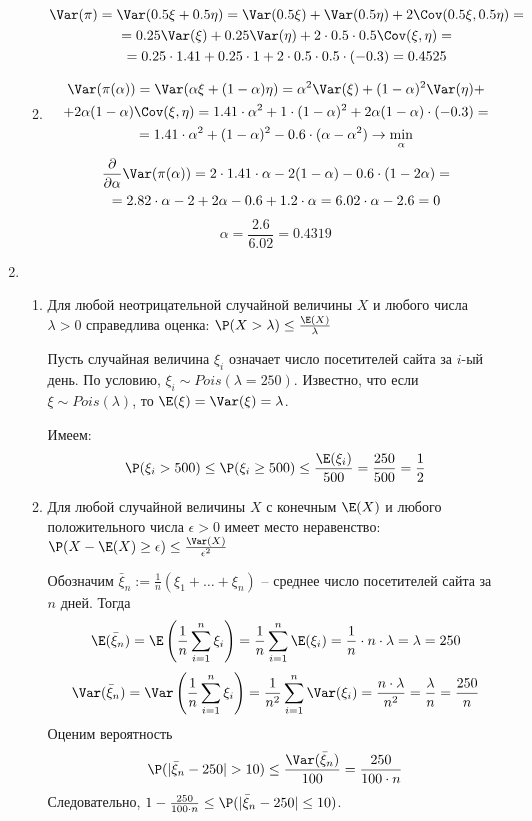 \begin{enumerate}
\begin{enumerate}
\begin{multline*}
\Var(\pi) = \Var(0.5 \xi + 0.5 \eta) = \Var(0.5 \xi) + \Var(0.5\eta) + 2 \Cov (0.5\xi, 0.5\eta) = \\
= 0.25\Var(\xi) + 0.25\Var(\eta) + 2 \cdot 0.5 \cdot 0.5 \Cov(\xi, \eta) = \\
= 0.25 \cdot 1.41 + 0.25 \cdot 1 + 2 \cdot 0.5 \cdot 0.5 \cdot (-0.3) = 0.4525
\end{multline*}
\item
\begin{multline*}
\Var(\pi(\alpha)) = \Var(\alpha \xi + (1-\alpha)\eta) = \alpha^2\Var(\xi) + (1-\alpha)^2 \Var(\eta) + \\
+ 2\alpha(1-\alpha) \Cov(\xi, \eta) = 1.41 \cdot \alpha^2 + 1\cdot (1-\alpha)^2 + 2\alpha(1-\alpha) \cdot (-0.3) = \\
= 1.41 \cdot \alpha^2 + (1-\alpha)^2 - 0.6 \cdot (\alpha - \alpha^2) \to \min_\alpha
\end{multline*}
\begin{multline*}
\frac{\partial}{\partial \alpha} \Var(\pi(\alpha)) = 2 \cdot 1.41 \cdot \alpha -2(1-\alpha) -0.6\cdot(1-2\alpha) = \\
= 2.82 \cdot \alpha - 2 + 2\alpha - 0.6 + 1.2 \cdot \alpha = 6.02 \cdot \alpha - 2.6 = 0
\end{multline*}
\[
\alpha = \frac{2.6}{6.02} = 0.4319
\]
\end{enumerate}
\item \begin{enumerate}
\item Для любой неотрицательной случайной величины $X$ и любого числа $\lambda > 0$ справедлива оценка: $\P(X>\lambda) \leq \frac{\E(X)}{\lambda}$

Пусть случайная величина $\xi_i$ означает число посетителей сайта за $i$-ый день. По условию, $\xi_i \sim Pois(\lambda=250)$. Известно, что если $\xi \sim Pois(\lambda)$, то $\E(\xi) = \Var(\xi) = \lambda$.

Имеем:
\[
\P(\xi_i >500) \leq \P(\xi_i \geq 500) \leq \frac{\E(\xi_i)}{500} = \frac{250}{500} = \frac{1}{2}
\]
\item Для любой случайной величины $X$ с конечным $\E(X)$ и любого положительного числа $\epsilon > 0$ имеет место неравенство: $\P(X-\E(X)\geq\epsilon)\leq\frac{\Var(X)}{\epsilon^2}$

Обозначим $\bar{\xi}_n := \frac{1}{n} \left(\xi_1 + \ldots + \xi_n\right)$ – среднее число посетителей сайта за $n$ дней. Тогда
\[
\E(\bar{\xi}_n) = \E\left(\frac{1}{n} \sum_{i=1}^{n} \xi_i\right) = \frac{1}{n} \sum_{i=1}^{n} \E(\xi_i) = \frac{1}{n} \cdot n \cdot \lambda = \lambda = 250
\]
\[
\Var(\bar{\xi}_n) = \Var\left(\frac{1}{n} \sum_{i=1}^{n} \xi_i\right) = \frac{1}{n^2} \sum_{i=1}^{n} \Var (\xi_i) = \frac{n \cdot \lambda}{n^2} = \frac{\lambda}{n} = \frac{250}{n}
\]
Оценим вероятность
\[
\P(\vert\bar{\xi}_n-250\vert > 10) \leq \frac{\Var(\bar{\xi}_n)}{100} = \frac{250}{100\cdot n}
\]
Следовательно, $1 - \frac{250}{100\cdot n} \leq \P(\vert\bar{\xi}_n-250\vert \leq 10)$.


\end{enumerate}
\end{enumerate}
